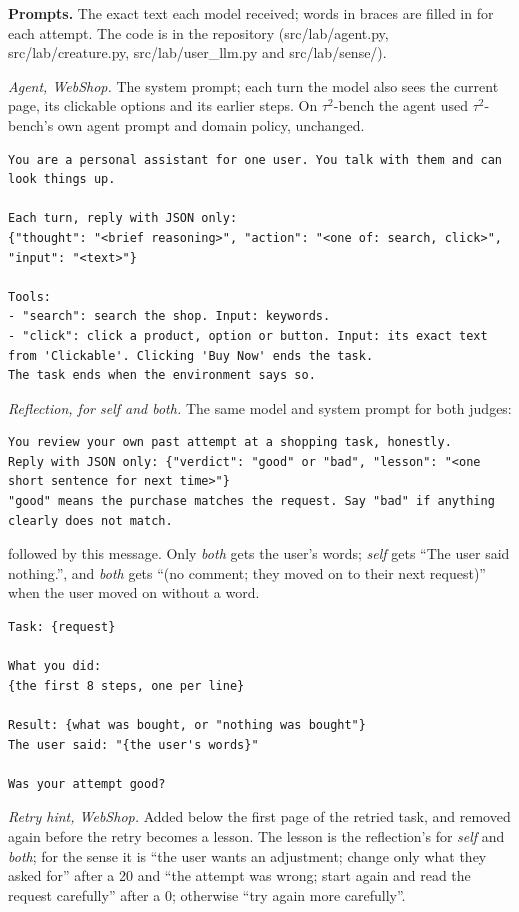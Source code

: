 \textbf{Prompts.} The exact text each model received; words in braces are filled in for each attempt. The code is in the repository (src/lab/agent.py, src/lab/creature.py, src/lab/user\_llm.py and src/lab/sense/).

\emph{Agent, WebShop.} The system prompt; each turn the model also sees the current page, its clickable options and its earlier steps. On $\tau^2$-bench the agent used $\tau^2$-bench's own agent prompt and domain policy, unchanged.

\begin{verbatim}
You are a personal assistant for one user. You talk with them and can look things up.

Each turn, reply with JSON only:
{"thought": "<brief reasoning>", "action": "<one of: search, click>", "input": "<text>"}

Tools:
- "search": search the shop. Input: keywords.
- "click": click a product, option or button. Input: its exact text from 'Clickable'. Clicking 'Buy Now' ends the task.
The task ends when the environment says so.
\end{verbatim}

\emph{Reflection, for self and both.} The same model and system prompt for both judges:

\begin{verbatim}
You review your own past attempt at a shopping task, honestly.
Reply with JSON only: {"verdict": "good" or "bad", "lesson": "<one short sentence for next time>"}
"good" means the purchase matches the request. Say "bad" if anything clearly does not match.
\end{verbatim}

followed by this message. Only \emph{both} gets the user's words; \emph{self} gets ``The user said nothing.'', and \emph{both} gets ``(no comment; they moved on to their next request)'' when the user moved on without a word.

\begin{verbatim}
Task: {request}

What you did:
{the first 8 steps, one per line}

Result: {what was bought, or "nothing was bought"}
The user said: "{the user's words}"

Was your attempt good?
\end{verbatim}

\emph{Retry hint, WebShop.} Added below the first page of the retried task, and removed again before the retry becomes a lesson. The lesson is the reflection's for \emph{self} and \emph{both}; for the sense it is ``the user wants an adjustment; change only what they asked for'' after a 20 and ``the attempt was wrong; start again and read the request carefully'' after a 0; otherwise ``try again more carefully''.


